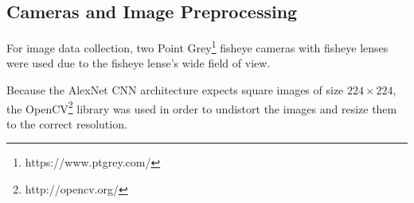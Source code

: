 \documentclass[letterpaper, 12 pt, conference]{ieeeconf}  %
\begin{document}
\subsection{Cameras and Image Preprocessing}

For image data collection, two Point Grey\footnote{https://www.ptgrey.com/} fisheye cameras with fisheye lenses were used due to the fisheye lense's wide field of view. 
\par
Because the AlexNet CNN architecture expects square images of size $224\times 224$, the OpenCV\footnote{http://opencv.org/} library was used in order to undistort the images and resize them to the correct resolution. 









\end{document}
